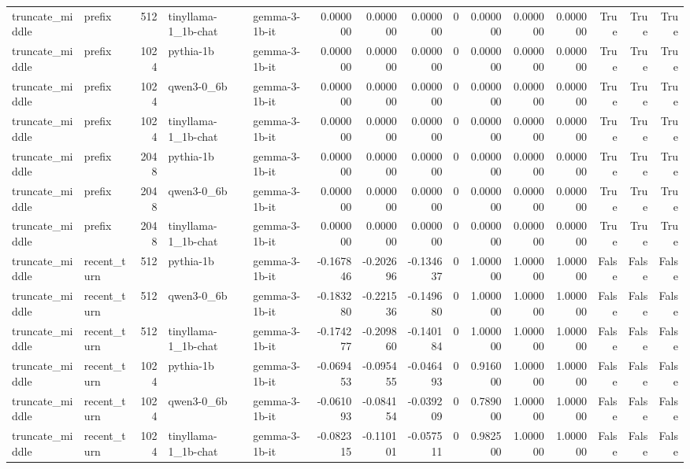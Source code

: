 \begin{tabular}{llrllrrrrrrrrrr}
truncate_middle & prefix & 512 & tinyllama-1_1b-chat & gemma-3-1b-it & 0.000000 & 0.000000 & 0.000000 & 0 & 0.000000 & 0.000000 & 0.000000 & True & True & True \\
truncate_middle & prefix & 1024 & pythia-1b & gemma-3-1b-it & 0.000000 & 0.000000 & 0.000000 & 0 & 0.000000 & 0.000000 & 0.000000 & True & True & True \\
truncate_middle & prefix & 1024 & qwen3-0_6b & gemma-3-1b-it & 0.000000 & 0.000000 & 0.000000 & 0 & 0.000000 & 0.000000 & 0.000000 & True & True & True \\
truncate_middle & prefix & 1024 & tinyllama-1_1b-chat & gemma-3-1b-it & 0.000000 & 0.000000 & 0.000000 & 0 & 0.000000 & 0.000000 & 0.000000 & True & True & True \\
truncate_middle & prefix & 2048 & pythia-1b & gemma-3-1b-it & 0.000000 & 0.000000 & 0.000000 & 0 & 0.000000 & 0.000000 & 0.000000 & True & True & True \\
truncate_middle & prefix & 2048 & qwen3-0_6b & gemma-3-1b-it & 0.000000 & 0.000000 & 0.000000 & 0 & 0.000000 & 0.000000 & 0.000000 & True & True & True \\
truncate_middle & prefix & 2048 & tinyllama-1_1b-chat & gemma-3-1b-it & 0.000000 & 0.000000 & 0.000000 & 0 & 0.000000 & 0.000000 & 0.000000 & True & True & True \\
truncate_middle & recent_turn & 512 & pythia-1b & gemma-3-1b-it & -0.167846 & -0.202696 & -0.134637 & 0 & 1.000000 & 1.000000 & 1.000000 & False & False & False \\
truncate_middle & recent_turn & 512 & qwen3-0_6b & gemma-3-1b-it & -0.183280 & -0.221536 & -0.149680 & 0 & 1.000000 & 1.000000 & 1.000000 & False & False & False \\
truncate_middle & recent_turn & 512 & tinyllama-1_1b-chat & gemma-3-1b-it & -0.174277 & -0.209860 & -0.140184 & 0 & 1.000000 & 1.000000 & 1.000000 & False & False & False \\
truncate_middle & recent_turn & 1024 & pythia-1b & gemma-3-1b-it & -0.069453 & -0.095455 & -0.046493 & 0 & 0.916000 & 1.000000 & 1.000000 & False & False & False \\
truncate_middle & recent_turn & 1024 & qwen3-0_6b & gemma-3-1b-it & -0.061093 & -0.084154 & -0.039209 & 0 & 0.789000 & 1.000000 & 1.000000 & False & False & False \\
truncate_middle & recent_turn & 1024 & tinyllama-1_1b-chat & gemma-3-1b-it & -0.082315 & -0.110101 & -0.057511 & 0 & 0.982500 & 1.000000 & 1.000000 & False & False & False \\

\end{tabular}
